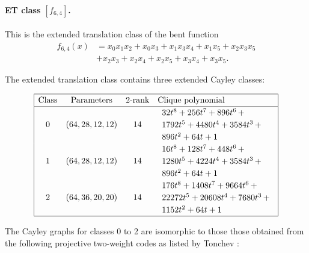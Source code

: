 \documentclass[12pt,a4paper]{article}
\begin{document}
\paragraph*{ET class $[f_{6,4}]$.}
%
This is the extended translation class of the bent function
\begin{align*}
f_{6,4}(x) &= x_{0} x_{1} x_{2} + x_{0} x_{3} + x_{1} x_{3} x_{4} + x_{1} x_{5} + x_{2} x_{3} x_{5}
\\
           &+ x_{2} x_{3} + x_{2} x_{4} + x_{2} x_{5} + x_{3} x_{4} + x_{3} x_{5}.
\end{align*}

The extended translation class contains
three extended Cayley classes:

\begin{table}[!bhpt] %
\small{}
\begin{align*}
\def\arraystretch{1.2}
\begin{array}{|cccl|}
\hline
\text{Class} &
\text{Parameters} &
\text{2-rank} &
\text{Clique polynomial}
\\
\hline
0 &
(64, 28, 12, 12) &
14 &
\begin{array}{l}
32t^{8} + 256t^{7} + 896t^{6}
\,+
\\
 1792t^{5} + 4480t^{4} + 3584t^{3}
\,+
\\
 896t^{2} + 64t + 1
\end{array}
\\
1 &
(64, 28, 12, 12) &
14 &
\begin{array}{l}
16t^{8} + 128t^{7} + 448t^{6}
\,+
\\
 1280t^{5} + 4224t^{4} + 3584t^{3}
\,+
\\
 896t^{2} + 64t + 1
\end{array}
\\
2 &
(64, 36, 20, 20) &
14 &
\begin{array}{l}
176t^{8} + 1408t^{7} + 9664t^{6}
\,+
\\
 22272t^{5} + 20608t^{4} + 7680t^{3}
\,+
\\
 1152t^{2} + 64t + 1
\end{array}
\\
\hline
\end{array}
\end{align*}
\caption{$f_{6,4}$ extended Cayley classes}
\label{tab-c6_4_EC_classes}
\end{table}

The Cayley graphs for classes 0 to 2 are isomorphic to those those obtained from the following
projective two-weight
codes as listed by Tonchev \cite{Ton07codes}:
\end{document}
